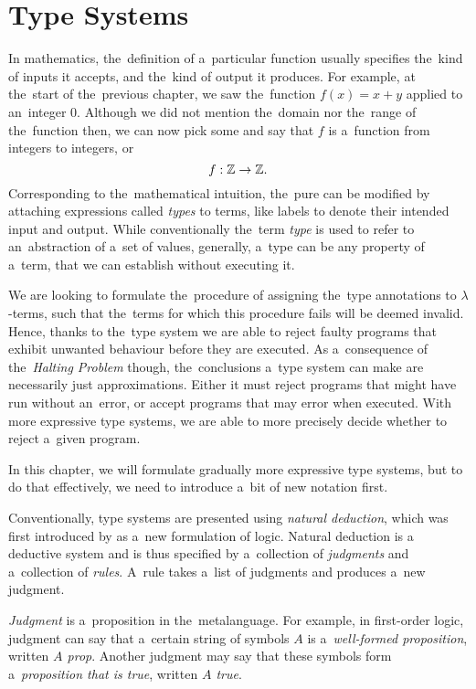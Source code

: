 \chapter{Type Systems}\label{cha:typesystems}

In mathematics, the~definition of a~particular function usually specifies
the~kind of inputs it accepts, and the~kind of output it produces. For example,
at the~start of the~previous chapter, we saw the~function $f(x) = x + y$ applied
to an~integer 0. Although we did not mention the~domain nor the~range of
the~function then, we can now pick some and say that $f$ is a~function from
integers to integers, or
\[
  f: \mathbb{Z} \to \mathbb{Z}.
\]
Corresponding to the~mathematical intuition, the~pure \lc can be modified by
attaching expressions called \emph{types} to terms, like labels to denote their
intended input and output. While conventionally the~term \emph{type} is used to
refer to an~abstraction of a~set of values, generally, a~type can be any
property of a~term, that we can establish without executing it.

We are looking to formulate the~procedure of assigning the~type annotations to
$\lambda$-terms, such that the~terms for which this procedure fails will be
deemed invalid. Hence, thanks to the~type system we are able to reject faulty
programs that exhibit unwanted behaviour before they are executed.
As a~consequence of the~\emph{Halting Problem} though, the~conclusions a~type
system can make are necessarily just approximations. Either it must reject
programs that might have run without an~error, or accept programs that may error
when executed. With more expressive type systems, we are able to more precisely
decide whether to reject a~given program.

In this chapter, we will formulate gradually more expressive type systems,
but to do that effectively, we need to introduce a~bit of new notation first.

\label{sec:natural_deduction}

Conventionally, type systems are presented using \emph{natural deduction}, which
was first introduced by \citet{gentzen_1935} as a~new formulation of logic.
Natural deduction is a deductive system and is thus specified by a~collection of
\emph{judgments} and a~collection of \emph{rules}. A~rule takes a~list of
judgments and produces a~new judgment.

\emph{Judgment} is a~proposition in the~metalanguage. For example, in
first-order logic, judgment can say that a~certain string of symbols $A$ is
a~\emph{well-formed proposition}, written \emph{$A$ prop}. Another judgment may
say that these symbols form a~\emph{proposition that is true}, written
\emph{$A$ true}.

